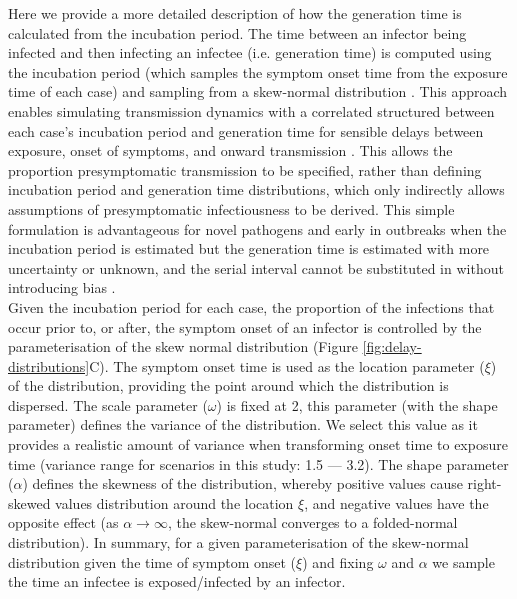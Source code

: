 \documentclass{article}
\begin{document}
Here we provide a more detailed description of how the generation time is calculated from the incubation period. The time between an infector being infected and then infecting an infectee (i.e. generation time) is computed using the incubation period (which samples the symptom onset time from the exposure time of each case) and sampling from a skew-normal distribution \citep{azzaliniClassDistributionsWhich1985}. This approach enables simulating transmission dynamics with a correlated structured between each case's incubation period and generation time for sensible delays between exposure, onset of symptoms, and onward transmission \citep{hellewellFeasibilityControllingCOVID192020, lintonCorrelationTimesSARSCoV22022}. This allows the proportion presymptomatic transmission to be specified, rather than defining incubation period and generation time distributions, which only indirectly allows assumptions of presymptomatic infectiousness to be derived. This simple formulation is advantageous for novel pathogens and early in outbreaks when the incubation period is estimated but the generation time is estimated with more uncertainty or unknown, and the serial interval cannot be substituted in without introducing bias \citep{brittonEstimationEmergingEpidemics2019a, lehtinenRelationshipSerialInterval2021}. \\

Given the incubation period for each case, the proportion of the infections that occur prior to, or after, the symptom onset of an infector is controlled by the parameterisation of the skew normal distribution (Figure \ref{fig:delay-distributions}C). The symptom onset time is used as the location parameter ($\xi$) of the distribution, providing the point around which the distribution is dispersed. The scale parameter ($\omega$) is fixed at 2, this parameter (with the shape parameter) defines the variance of the distribution. We select this value as it provides a realistic amount of variance when transforming onset time to exposure time (variance range for scenarios in this study: 1.5 --- 3.2). The shape parameter ($\alpha$) defines the skewness of the distribution, whereby positive values cause right-skewed values distribution around the location $\xi$, and negative values have the opposite effect (as $\alpha \rightarrow \infty$, the skew-normal converges to a folded-normal distribution). In summary, for a given parameterisation of the skew-normal distribution given the time of symptom onset ($\xi$) and fixing $\omega$ and $\alpha$ we sample the time an infectee is exposed/infected by an infector. \\
\end{document}
